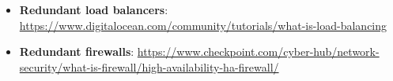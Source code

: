\clearpage

\begin{itemize}
    \item \textbf{Redundant load balancers}: \url{https://www.digitalocean.com/community/tutorials/what-is-load-balancing}
    \item \textbf{Redundant firewalls}: \url{https://www.checkpoint.com/cyber-hub/network-security/what-is-firewall/high-availability-ha-firewall/}
\end{itemize}